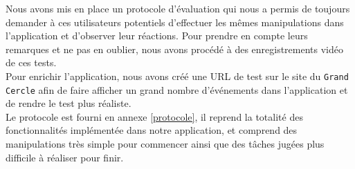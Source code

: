 \documentclass[a4paper, 11px]{article}
\begin{document}
Nous avons mis en place un protocole d'évaluation qui nous a permis de toujours demander à ces utilisateurs potentiels d'effectuer les mêmes manipulations dans l'application et d'observer leur réactions. Pour prendre en compte leurs remarques et ne pas en oublier, nous avons procédé à des enregistrements vidéo de ces tests.\\
Pour enrichir l'application, nous avons créé une URL de test sur le site du \texttt{Grand Cercle} afin de faire afficher un grand nombre d'événements dans l'application et de rendre le test plus réaliste.\\

Le protocole est fourni en annexe \ref{protocole}, il reprend la totalité des fonctionnalités implémentée dans notre application, et comprend des manipulations très simple pour commencer ainsi que des tâches jugées plus difficile à réaliser pour finir.


\appendix
\addappheadtotoc

\newpage
\end{document}

